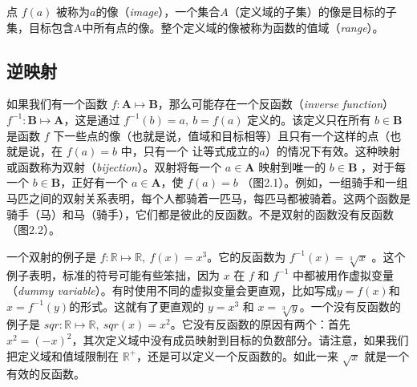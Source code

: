 \documentclass[lang=cn,12pt,marginpar=margintrue]{elegantbook}
\begin{document}
点 $f(a)$ 被称为$a$的像（\textit{image}），一个集合$A$（定义域的子集）的像是目标的子集，目标包含A中所有点的像。整个定义域的像被称为函数的值域（\textit{range}）。

\subsection{逆映射}


如果我们有一个函数 $f : \textbf{A} \mapsto \textbf{B}$，那么可能存在一个反函数（\textit{inverse function}） $f^{-1} : \textbf{B} \mapsto \textbf{A}$，这是通过 $ f^{-1}(b) = a,\ b = f(a)$ 定义的。该定义只在所有 $b \in \textbf{B}$是函数 $f$ 下一些点的像（也就是说，值域和目标相等）且只有一个这样的点（也就是说，在 $f(a) = b$ 中，只有一个 让等式成立的$a$）的情况下有效。这种映射或函数称为双射（\textit{bijection}）。双射将每一个 $a \in \textbf{A}$ 映射到唯一的 $b \in \textbf{B}$ ，对于每一个 $b \in \textbf{B}$，正好有一个 $a \in \textbf{A}$，使 $f(a)=b$ （图2.1）。例如，一组骑手和一组马匹之间的双射关系表明，每个人都骑着一匹马，每匹马都被骑着。这两个函数是骑手（马）和马（骑手），它们都是彼此的反函数。不是双射的函数没有反函数（图2.2）。


一个双射的例子是 $f : \mathbb{R} \mapsto \mathbb{R},\ f(x) = x^3$。它的反函数为 $f^{-1}(x) = \sqrt[3]{x}$ 。这个例子表明，标准的符号可能有些笨拙，因为 $x$ 在 $f$ 和 $f^{-1}$ 中都被用作虚拟变量（\textit{dummy variable}）。有时使用不同的虚拟变量会更直观，比如写成$y = f(x)$和$x=f^{-1}(y)$的形式。这就有了更直观的 $y = x^3$ 和 $x = \sqrt[3]{y}$。一个没有反函数的例子是 $sqr : \mathbb{R} \mapsto \mathbb{R},\ sqr(x) = x^2$。它没有反函数的原因有两个：首先 $x^2 = (-x)^2$，其次定义域中没有成员映射到目标的负数部分。请注意，如果我们把定义域和值域限制在 $\mathbb{R^+}$，还是可以定义一个反函数的。如此一来 $\sqrt{x}$ 就是一个有效的反函数。
\end{document}
